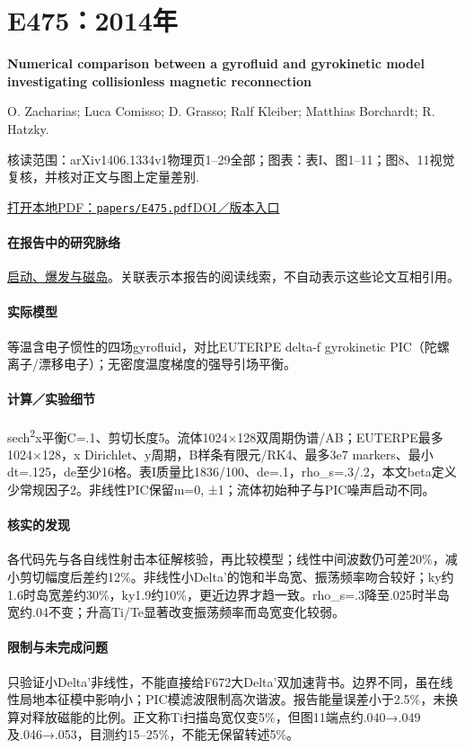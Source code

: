 \documentclass[UTF8,a4paper,11pt,openany,fontset=fandol]{ctexbook}
\begin{document}
\section{E475：2014年}\label{paper:E475}

\textbf{Numerical comparison between a gyrofluid and gyrokinetic model investigating collisionless magnetic reconnection}\citep{E475}\

O. Zacharias;  Luca Comisso;  D. Grasso;  Ralf Kleiber;  Matthias Borchardt;  R. Hatzky.

\textsf{核读范围：}arXiv1406.1334v1物理页1–29全部；\textsf{图表：}表I、图1–11；图8、11视觉复核，并核对正文与图上定量差别.

\href{run:../papers/E475.pdf}{打开本地PDF：\texttt{papers/E475.pdf}}\quad\href{https://doi.org/10.1063/1.4882679}{DOI／版本入口}

\paragraph{在报告中的研究脉络}\hyperref[story:onset]{启动、爆发与磁岛}。关联表示本报告的阅读线索，不自动表示这些论文互相引用。

\paragraph{实际模型}等温含电子惯性的四场gyrofluid，对比EUTERPE delta-f gyrokinetic PIC（陀螺离子/漂移电子）；无密度温度梯度的强导引场平衡。

\paragraph{计算／实验细节}sech\textsuperscript{2}x平衡C=.1、剪切长度5。流体1024×128双周期伪谱/AB；EUTERPE最多1024×128，x Dirichlet、y周期，B样条有限元/RK4、最多3e7 markers、最小dt=.125，de至少16格。表I质量比1836/100、de=.1，rho\_s=.3/.2，本文beta定义少常规因子2。非线性PIC保留m=0, ±1；流体初始种子与PIC噪声启动不同。

\paragraph{核实的发现}各代码先与各自线性射击本征解核验，再比较模型；线性中间波数仍可差20\%，减小剪切幅度后差约12\%。非线性小Delta'的饱和半岛宽、振荡频率吻合较好；ky约1.6时岛宽差约30\%，ky1.9约10\%，更近边界才趋一致。rho\_s=.3降至.025时半岛宽约.04不变；升高Ti/Te显著改变振荡频率而岛宽变化较弱。

\paragraph{限制与未完成问题}只验证小Delta'非线性，不能直接给F672大Delta'双加速背书。边界不同，虽在线性局地本征模中影响小；PIC模滤波限制高次谐波。报告能量误差小于2.5\%，未换算对释放磁能的比例。正文称Ti扫描岛宽仅变5\%，但图11端点约.040→.049及.046→.053，目测约15–25\%，不能无保留转述5\%。
\end{document}

